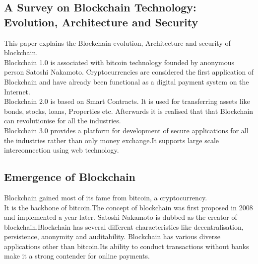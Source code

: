 \documentclass{IEEEtran}
\begin{document}
    \subsection{A Survey on Blockchain Technology: Evolution, Architecture and Security \cite{9402747}}
      This paper explains the Blockchain evolution, Architecture and security of blockchain.\\
      Blockchain 1.0 is associated with bitcoin technology founded by anonymous person Satoshi Nakamoto. Cryptocurrencies are considered the first application of Blockchain and have already been functional as a digital payment system on the Internet.\\
      Blockchain 2.0 is based on Smart Contracts. It is used for transferring assets like bonds, stocks, loans, Properties etc. Afterwards it is realised that that Blockchain can revolutionise for all the industries.\\
      Blockchain 3.0 provides a platform for development of secure applications for all the industries rather than only money exchange.It supports large scale interconnection using web technology.

    \subsection{Emergence of Blockchain \cite{zheng2018blockchain}}
      Blockchain gained most of its fame from bitcoin, a cryptocurrency.\\
      It is the backbone of bitcoin.The concept of blockchain was first proposed in 2008 and implemented a year later. Satoshi Nakamoto is dubbed as the creator of blockchain.Blockchain has several different characteristics like decentralisation, persistence, anonymity and auditability. Blockchain has various diverse applications other than bitcoin.Its ability to conduct transactions without banks make it a strong contender for online payments.
\end{document}

